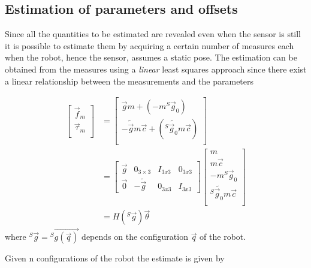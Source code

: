 \subsection{Estimation of parameters and offsets}
Since all the quantities to be estimated are revealed even when the sensor is still
it is possible to estimate them by acquiring a certain number of measures each when
the robot, hence the sensor, assumes a static pose. The estimation can be obtained
from the measures using a \emph{linear} least squares approach since there exist
a linear relationship between the measurements and the parameters

\begin{equation*}
  \begin{flalign*}
    \begin{bmatrix}
      \vec{f}_{m} \\
      \vec{\tau}_{m} \\
    \end{bmatrix} &=
    \begin{bmatrix}
      \vec{g} m + (-m {}^S \vec{g}_{0}) \\
      -\tilde{\vec{g}} m\vec{c} + ({}^S \tilde{\vec{g}_{0}} m\vec{c}) \\
    \end{bmatrix}\\
    & =
    \begin{bmatrix}
      \vec{g} & 0_{3 \times 3} & I_{3x3} & 0_{3x3} \\
      \vec{0} & -\tilde{\vec{g}} & 0_{3x3} & I_{3x3}
    \end{bmatrix}
    \begin{bmatrix}
      m \\
      m \vec{c} \\
      -m {}^S \vec{g}_{0} \\
      {}^S \tilde{\vec{g}_{0}} m\vec{c} \\
    \end{bmatrix}\\
    &=
    H({}^S \vec{g}) \vec{\theta}
  \end{flalign*}
\end{equation*}
where ${}^S \vec{g} = {}^S \vec{g(\vec{q})}$ depends on the configuration $\vec{q}$ of the robot.
\par
Given n configurations of the robot the estimate is given by
